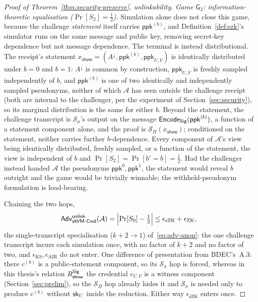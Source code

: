 \begin{proof}[Proof of Theorem~\ref{thm:security-preserve}, unlinkability]
    \smallskip\noindent\emph{Game $\mathsf G_2$: information-theoretic
equalisation ($\Pr[S_2]=\tfrac12$).} Simulation alone does not close this game, because the challenge \emph{statement} itself carries $\mathsf{ppk}^{(b)}$, and Definition~\ref{def:szk}'s simulator runs on the same message and public key, removing secret-key dependence but not message dependence. The terminal is instead distributional. The receipt's statement $x_{\mathsf{show}}=(A^\downarrow,\mathsf{ppk}^{(b)},\mathsf{ppk}_{U,V})$ is identically distributed under $b=0$ and $b=1$: $A^\downarrow$ is common by construction, $\mathsf{ppk}_{U,V}$ is freshly sampled independently of $b$, and $\mathsf{ppk}^{(b)}$ is one of two identically and independently sampled pseudonyms, neither of which $\mathcal A$ has seen outside the challenge receipt (both are internal to the challenger, per the experiment of Section~\ref{sec:security}), so its marginal distribution is the same for either $b$. Beyond the statement, the challenge transcript is $\mathcal S_\sigma$'s output on the message $\mathsf{Encode}_{\mathsf{Sig}}(\mathsf{ppk}^{(b)})$, a function of a statement component alone, and the proof is $\mathcal S_\Pi(x_{\mathsf{show}})$; conditioned on the statement, neither carries further $b$-dependence. Every component of $\mathcal A$'s view being identically distributed, freshly sampled, or a function of the statement, the view is independent of $b$ and $\Pr[S_2]=\Pr[b'=b]=\tfrac12$. Had the challenger instead handed $\mathcal A$ the pseudonyms $\mathsf{ppk}^0,\mathsf{ppk}^1$, the statement would reveal $b$ outright and the game would be trivially winnable; the withheld-pseudonym formulation is load-bearing.

    \smallskip\noindent Chaining the two hops,
    \[
      \mathsf{Adv}^{\mathsf{unlink}}_{\mathsf{zkVM\text{-}Cred}}(\mathcal A)
      =\Bigl|\Pr[S_0]-\tfrac12\Bigr|
      \le \epsilon_{\mathrm{sZK}}+\epsilon_{\mathrm{ZK}},
    \]
the single-transcript specialisation ($k+2\to1$) of~\eqref{eq:adv-anon}: the one challenge transcript incurs each simulation once, with no factor of $k+2$ and no factor of two, and $\epsilon_{\mathrm{KS}},\epsilon_{\mathrm{AIR}}$ do not enter. One difference of presentation from BDEC's~A.3: there $c^{(b)}$ is a public-statement component, so its $\mathcal S_\sigma$ hop is forced, whereas in this thesis's relation $R^{\mathsf{Sig}}_{\mathsf{show}}$ the credential $c_{U,V}$ is a witness component (Section~\ref{sec:prelim}), so the $\mathcal S_\Pi$ hop already hides it and $\mathcal S_\sigma$ is needed only to produce $c^{(b)}$ without $\mathsf{sk}_U$ inside the reduction. Either way $\epsilon_{\mathrm{sZK}}$ enters once.
\end{proof}

